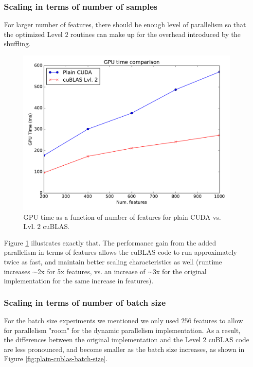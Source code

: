 \documentclass[11pt,a4paper]{article}
\begin{document}
\pagebreak

\subsubsection*{Scaling in terms of number of samples}

For larger number of features, there should be enough level of parallelism so that
the optimized Level 2 routines can make up for the overhead introduced by the shuffling.

\begin{figure}[H]
	\centering
	\includegraphics[width=0.8\linewidth]{gpu_plain_vs_Lvl2cuBLAS-200f-1000f.pdf}
	\caption{GPU time as a function of number of features for plain CUDA  vs. Lvl. 2 cuBLAS.}
	\label{fig:plain-cublas-n-features}
\end{figure}

Figure \ref{fig:plain-cublas-n-features} illustrates exactly that. The performance gain
from the added parallelism in terms of features allows the cuBLAS code to run approximately twice
as fast, and maintain better scaling characteristics as well (runtime increases $\sim$2x for 5x features,
vs. an increase of $\sim$3x for the original implementation for the same increase in features).

\subsubsection*{Scaling in terms of number of batch size}

For the batch size experiments we mentioned we only used 256 features to allow for parallelism "room"
for the dynamic parallelism implementation. As a result, the differences between the original
implementation and the Level 2 cuBLAS code are less pronounced, and become smaller as the batch
size increases, as shown in Figure \ref{fig:plain-cublas-batch-size}.
\end{document}
